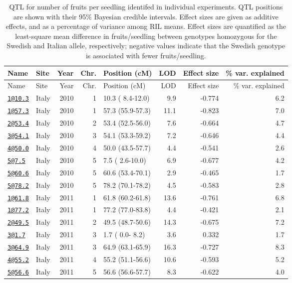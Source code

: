 \documentclass[]{article}
\begin{document}
\begin{longtable}[]{@{}llrrlrrr@{}}
\caption{\label{tab:individual-ffit-qtl}QTL for number of fruits per seedling identifed in individual experiments. QTL positions are shown with their 95\% Bayesian credible intervals. Effect sizes are given as additive effects, and as a percentage of variance among RIL means. Effect sizes are quantified as the least-square mean difference in fruits/seedling between genotypes homozygous for the Swedish and Italian allele, respectively; negative values indicate that the Swedish genotype is associated with fewer fruits/seedling.}\tabularnewline
\toprule
Name & Site & Year & Chr. & Position (cM) & LOD & Effect size & \% var. explained\tabularnewline
\midrule
\endfirsthead
\toprule
Name & Site & Year & Chr. & Position (cM) & LOD & Effect size & \% var. explained\tabularnewline
\midrule
\endhead
\href{mailto:1@10.3}{\nolinkurl{1@10.3}} & Italy & 2010 & 1 & 10.3 ( 8.4-12.0) & 9.9 & -0.774 & 6.2\tabularnewline
\href{mailto:1@57.3}{\nolinkurl{1@57.3}} & Italy & 2010 & 1 & 57.3 (55.9-57.3) & 11.1 & -0.823 & 7.0\tabularnewline
\href{mailto:2@53.4}{\nolinkurl{2@53.4}} & Italy & 2010 & 2 & 53.4 (52.5-56.0) & 7.6 & -0.664 & 4.7\tabularnewline
\href{mailto:3@54.1}{\nolinkurl{3@54.1}} & Italy & 2010 & 3 & 54.1 (53.3-59.2) & 7.2 & -0.646 & 4.4\tabularnewline
\href{mailto:4@50.0}{\nolinkurl{4@50.0}} & Italy & 2010 & 4 & 50.0 (43.5-57.7) & 4.4 & -0.541 & 2.6\tabularnewline
\href{mailto:5@7.5}{\nolinkurl{5@7.5}} & Italy & 2010 & 5 & 7.5 ( 2.6-10.0) & 6.9 & -0.677 & 4.2\tabularnewline
\href{mailto:5@60.6}{\nolinkurl{5@60.6}} & Italy & 2010 & 5 & 60.6 (53.4-70.1) & 2.9 & -0.465 & 1.7\tabularnewline
\href{mailto:5@78.2}{\nolinkurl{5@78.2}} & Italy & 2010 & 5 & 78.2 (70.1-78.2) & 4.5 & -0.583 & 2.8\tabularnewline
\href{mailto:1@61.8}{\nolinkurl{1@61.8}} & Italy & 2011 & 1 & 61.8 (60.2-61.8) & 13.6 & -0.761 & 6.8\tabularnewline
\href{mailto:1@77.2}{\nolinkurl{1@77.2}} & Italy & 2011 & 1 & 77.2 (77.0-83.8) & 4.4 & -0.421 & 2.1\tabularnewline
\href{mailto:2@49.5}{\nolinkurl{2@49.5}} & Italy & 2011 & 2 & 49.5 (48.7-50.6) & 14.3 & -0.675 & 7.2\tabularnewline
\href{mailto:3@1.7}{\nolinkurl{3@1.7}} & Italy & 2011 & 3 & 1.7 ( 0.0- 8.2) & 3.6 & 0.332 & 1.7\tabularnewline
\href{mailto:3@64.9}{\nolinkurl{3@64.9}} & Italy & 2011 & 3 & 64.9 (63.1-65.9) & 16.3 & -0.727 & 8.3\tabularnewline
\href{mailto:4@55.2}{\nolinkurl{4@55.2}} & Italy & 2011 & 4 & 55.2 (51.1-56.6) & 10.6 & -0.593 & 5.2\tabularnewline
\href{mailto:5@56.6}{\nolinkurl{5@56.6}} & Italy & 2011 & 5 & 56.6 (56.6-57.7) & 8.3 & -0.622 & 4.0\tabularnewline

\end{longtable}
\end{document}
